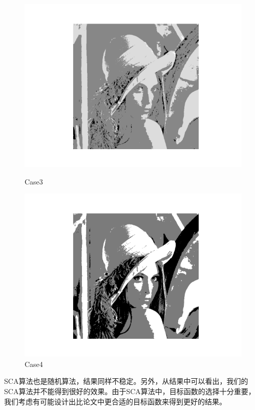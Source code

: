 \documentclass{article}
\begin{document}
\begin{figure}[h]
\begin{minipage}[t]{0.2\textwidth}
		\includegraphics[width=\textwidth]{SCA_3.png}
		\caption{Case3}
	\end{minipage}
	\begin{minipage}[t]{0.2\textwidth}
		\centering
		\includegraphics[width=\textwidth]{SCA_4.png}
		\caption{Case4}
	\end{minipage}
\end{figure}

SCA算法也是随机算法，结果同样不稳定。另外，从结果中可以看出，我们的SCA算法并不能得到很好的效果。由于SCA算法中，目标函数的选择十分重要，我们考虑有可能设计出比论文中更合适的目标函数来得到更好的结果。

\end{document}
